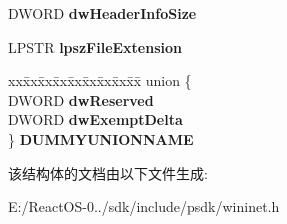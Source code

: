 \begin{DoxyCompactItemize}
D\+W\+O\+RD {\bfseries dw\+Header\+Info\+Size}
\item 
\mbox{\label{struct___i_n_t_e_r_n_e_t___c_a_c_h_e___e_n_t_r_y___i_n_f_o_a_a13ddcf372b92076c16c17a0b37f7f57d}} 
L\+P\+S\+TR {\bfseries lpsz\+File\+Extension}
\item 
\mbox{\label{struct___i_n_t_e_r_n_e_t___c_a_c_h_e___e_n_t_r_y___i_n_f_o_a_a5305b7b4ed7512fc3e14e7f222ec6805}} 
\begin{tabbing}
xx\=xx\=xx\=xx\=xx\=xx\=xx\=xx\=xx\=\kill
union \{\\
\>DWORD {\bfseries dwReserved}\\
\>DWORD {\bfseries dwExemptDelta}\\
\} {\bfseries DUMMYUNIONNAME}\\

\end{tabbing}\end{DoxyCompactItemize}


该结构体的文档由以下文件生成\+:\begin{DoxyCompactItemize}
\item 
E\+:/\+React\+O\+S-\/0../sdk/include/psdk/wininet.\+h\end{DoxyCompactItemize}
